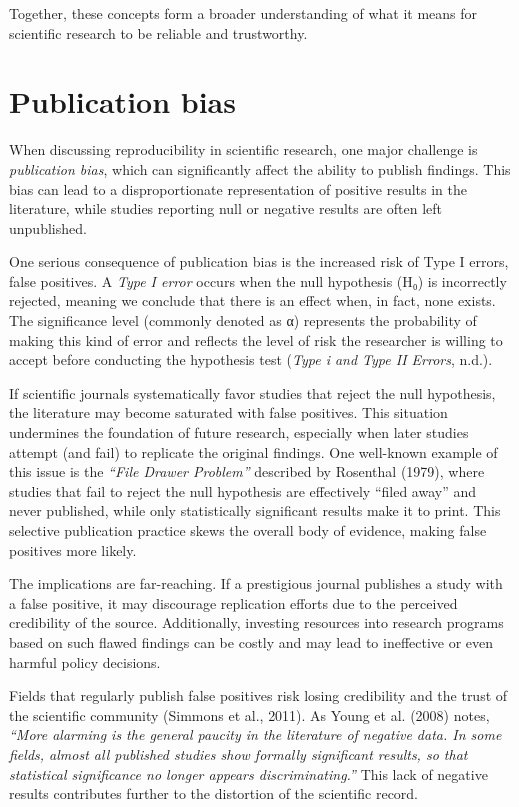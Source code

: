 \documentclass[
  british,
  a4paper,
]{article}
\begin{document}
Together, these concepts form a broader understanding of what it means
for scientific research to be reliable and trustworthy.

\section{Publication bias}\label{publication-bias}

When discussing reproducibility in scientific research, one major
challenge is \emph{publication bias}, which can significantly affect the
ability to publish findings. This bias can lead to a disproportionate
representation of positive results in the literature, while studies
reporting null or negative results are often left unpublished.

One serious consequence of publication bias is the increased risk of
Type I errors, false positives. A \emph{Type I error} occurs when the
null hypothesis (H₀) is incorrectly rejected, meaning we conclude that
there is an effect when, in fact, none exists. The significance level
(commonly denoted as α) represents the probability of making this kind
of error and reflects the level of risk the researcher is willing to
accept before conducting the hypothesis test (\emph{Type i and Type II
Errors}, n.d.).

If scientific journals systematically favor studies that reject the null
hypothesis, the literature may become saturated with false positives.
This situation undermines the foundation of future research, especially
when later studies attempt (and fail) to replicate the original
findings. One well-known example of this issue is the \emph{``File
Drawer Problem''} described by Rosenthal (1979), where studies that fail
to reject the null hypothesis are effectively ``filed away'' and never
published, while only statistically significant results make it to
print. This selective publication practice skews the overall body of
evidence, making false positives more likely.

The implications are far-reaching. If a prestigious journal publishes a
study with a false positive, it may discourage replication efforts due
to the perceived credibility of the source. Additionally, investing
resources into research programs based on such flawed findings can be
costly and may lead to ineffective or even harmful policy decisions.

Fields that regularly publish false positives risk losing credibility
and the trust of the scientific community (Simmons et al., 2011). As
Young et al. (2008) notes, \emph{``More alarming is the general paucity
in the literature of negative data. In some fields, almost all published
studies show formally significant results, so that statistical
significance no longer appears discriminating.''} This lack of negative
results contributes further to the distortion of the scientific record.
\end{document}
